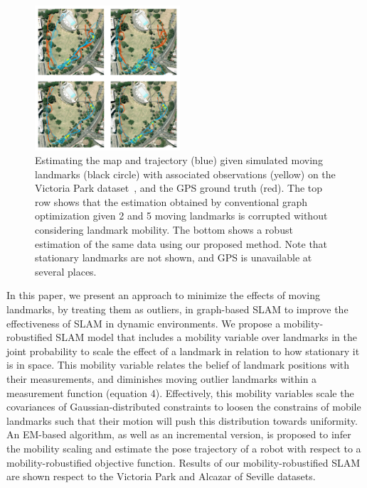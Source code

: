 \begin{figure}[t!]
\centering
  \includegraphics[width=0.48\textwidth]{fig/teaser}
  \caption{Estimating the map and trajectory (blue) given simulated moving landmarks (black circle) with associated observations (yellow) on the Victoria Park dataset~\cite{isam}, and the GPS ground truth (red). The top row shows that the estimation obtained by conventional graph optimization given 2 and 5 moving landmarks is corrupted without considering landmark mobility. The bottom shows a robust estimation of the same data using our proposed method. Note that stationary landmarks are not shown, and GPS is unavailable at several places. }
  \label{fig:teaser}
\end{figure}

In this paper, we present an approach to minimize the effects of
moving landmarks, by treating them as outliers, in graph-based SLAM to
improve the effectiveness of SLAM in dynamic environments.  We
propose a mobility-robustified SLAM model that includes a mobility
variable over landmarks in the joint probability to scale the effect
of a landmark in relation to how stationary it is in space.  This
mobility variable relates the belief of landmark positions with their
measurements, and diminishes moving outlier landmarks within a
measurement function (equation 4).
Effectively, this mobility variables scale the covariances
of Gaussian-distributed constraints to loosen the constrains of mobile landmarks such that their motion will push this distribution towards uniformity.
  An EM-based algorithm, as well as
an incremental version, is proposed to infer the mobility scaling
and estimate the pose trajectory of a robot with respect to a
mobility-robustified objective function. Results of our
mobility-robustified SLAM are shown respect to the
Victoria Park \cite{isam} and Alcazar of Seville \cite{iros14-frog} datasets.
